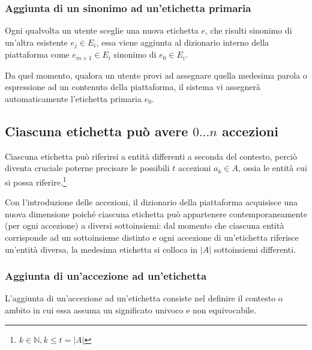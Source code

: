 \documentclass[10pt,a4paper,headinclude,footinclude,hidelinks]{scrreprt} %
\begin{document}
	\subsubsection{Aggiunta di un sinonimo ad un'etichetta primaria}
	Ogni qualvolta un utente sceglie una nuova etichetta $e$, che risulti sinonimo di un'altra esistente $e_j \in E_i$, essa viene aggiunta al dizionario interno della piattaforma come $e_{m+1} \in E_i$ sinonimo di $e_0 \in E_i$.

	Da quel momento, qualora un utente provi ad assegnare quella medesima parola o espressione ad un contenuto della piattaforma, il sistema vi assegnerà automaticamente l'etichetta primaria $e_0$.

	\subsection[Accezioni]{Ciascuna etichetta può avere $0...n$ accezioni}
	Ciascuna etichetta può riferirsi a entità differenti a seconda del contesto, perciò diventa cruciale poterne precisare le possibili $t$ accezioni $a_k \in A$, ossia le entità cui si possa riferire.\footnote{$k \in \mathbb{N}, k \leq t=\left|A\right|$}
	
	Con l'introduzione delle accezioni, il dizionario della piattaforma acquisisce una nuova dimensione poiché ciascuna etichetta può appartenere contemporaneamente (per ogni accezione) a diversi sottoinsiemi: dal momento che ciascuna entità corrisponde ad un sottoinsieme distinto e ogni accezione di un'etichetta riferisce un'entità diversa, la medesima etichetta si colloca in $\left|A\right|$ sottoinsiemi differenti.

	\subsubsection{Aggiunta di un'accezione ad un'etichetta}
	L'aggiunta di un'accezione ad un'etichetta consiste nel definire il contesto o ambito in cui essa assuma un significato univoco e non equivocabile.
\end{document}

